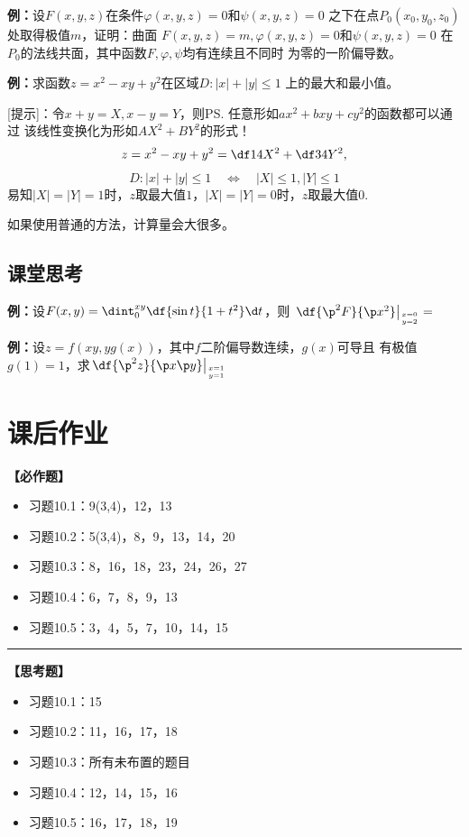 {\bf 例：}设$F(x,y,z)$在条件$\varphi(x,y,z)=0$和$\psi(x,y,z)=0$
之下在点$P_0(x_0,y_0,z_0)$处取得极值$m$，证明：曲面
$F(x,y,z)=m,\varphi(x,y,z)=0$和$\psi(x,y,z)=0$
在$P_0$的法线共面，其中函数$F,\varphi,\psi$均有连续且不同时
为零的一阶偏导数。

{\bf 例：}求函数$z=x^2-xy+y^2$在区域$D:|x|+|y|\leq 1$
上的最大和最小值。

[提示]：令$x+y=X,x-y=Y$，则\ps{任意形如$ax^2+bxy+cy^2$的函数都可以通过
该线性变换化为形如$AX^2+BY^2$的形式！}
$$z=x^2-xy+y^2=\df14X^2+\df34Y^2,$$
$$D:|x|+|y|\leq 1\quad\Leftrightarrow\quad |X|\leq1,|Y|\leq1$$
易知$|X|=|Y|=1$时，$z$取最大值$1$，$|X|=|Y|=0$时，$z$取最大值$0$.

如果使用普通的方法，计算量会大很多。

\subsection*{课堂思考}

{\bf 例：}设$F(x,y)=\dint_0^{xy}\df{\sin t}{1+t^2}\d t$，则
$\left.\df{\p^2F}{\p x^2}\right|_{x=0 \atop y=2}=$
\underline{\quad\quad\quad}

{\bf 例：}设$z=f(xy,yg(x))$，其中$f$二阶偏导数连续，$g(x)$可导且
有极值$g(1)=1$，求$\left.\df{\p^2z}{\p x\p y}\right|_{x=1\atop y=1}$

\newpage

\section*{课后作业}

{\bf 【必作题】}

\begin{itemize}
  \setlength{\itemindent}{1cm}
  \item 习题10.1：9(3,4)，12，13
  \item 习题10.2：5(3,4)，8，9，13，14，20
  \item 习题10.3：8，16，18，23，24，26，27
  \item 习题10.4：6，7，8，9，13
  \item 习题10.5：3，4，5，7，10，14，15
\end{itemize}

\bigskip

\hrule

\bigskip

{\bf 【思考题】}

\begin{itemize}
  \setlength{\itemindent}{1cm}
  \item 习题10.1：15
  \item 习题10.2：11，16，17，18
  \item 习题10.3：所有未布置的题目
  \item 习题10.4：12，14，15，16
  \item 习题10.5：16，17，18，19
\end{itemize}

